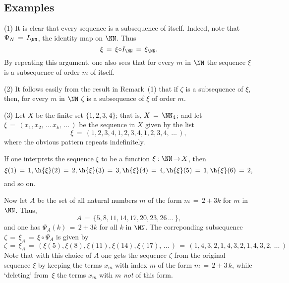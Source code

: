 {\V
\V

        \subsection{\small{{\bf Examples}}}
        \label{ExampA40.80}

\V

\hspace*{\parindent}
        (1) It is clear that every sequence is a subsequence of itself.
    Indeed, note that ${\Psi}_{N} \,=\, I_{{\NN}}$, the identity map on ${\NN}$.
    Thus
        \begin{displaymath}
        {\xi} \,=\, {\xi}{\circ}I_{{\NN}} \,=\, {\xi}_{{\NN}}.
        \end{displaymath}
    By repeating this argument, one also sees that for every $m$ in ${\NN}$ the sequence ${\xi}$ is a subsequence of order $m$ of itself.

\V

        (2) It follows easily from the result in Remark~(1) that if ${\zeta}$ is a subsequence of ${\xi}$,
    then, for every $m$ in ${\NN}$ ${\zeta}$ is a subsequence of ${\xi}$ of order $m$.

\V

        (3) Let $X$ be the finite set $\{1,2,3,4\}$; that is, $X \,=\, {\NN}_{4}$; and let ${\xi} \,=\, (x_{1}, x_{2},\,{\ldots}\,x_{k},\,{\ldots}\,)$ be the sequence in $X$ given by the list
        \begin{displaymath}
        {\xi} \,=\, (1,2,3,4,1,2,3,4,1,2,3,4,\,{\ldots}\,),
        \end{displaymath}
    where the obvious pattern repeats indefinitely.

        If one interprets the sequence ${\xi}$ to be a function ${\xi}:{\NN} \,{\rightarrow}\, X$, then
        \begin{displaymath}
        {\xi}(1) \,=\, 1, \h {\xi}(2) \,=\, 2, \h {\xi}(3) \,=\, 3, \h {\xi}(4) \,=\, 4, \h {\xi}(5) \,=\, 1, \h {\xi}(6) \,=\, 2,
        \end{displaymath}
    and so on.

        Now let $A$ be the set of all natural numbers $m$ of the form $m \,=\, 2+3k$ for $m$ in ${\NN}$. Thus,
        \begin{displaymath}
        A \,=\, \{5, 8, 11, 14, 17, 20, 23, 26\,{\ldots}\,\},
        \end{displaymath}
    and one has ${\Psi}_{A}(k) \,=\, 2+3k$ for all $k$ in ${\NN}$.
    The correponding subsequence ${\zeta} \,=\, {\xi}_{A} \,=\, {\xi}{\circ}{\Psi}_{A}$ is given by
        \begin{displaymath}
        {\zeta} \,=\, {\xi}_{A} \,=\, ({\xi}(5),{\xi}(8),{\xi}(11),{\xi}(14),{\xi}(17),\,{\ldots}\,) \,=\, 
    (1,4,3,2,1,4,3,2,1,4,3,2,\,{\ldots}\,)
        \end{displaymath}
    Note that with this choice of $A$ one gets the sequence ${\zeta}$ from the original sequence ${\xi}$
    by keeping the terms $x_{m}$ with index $m$ of the form $m \,=\, 2+3\,k$, while `deleting' from~${\xi}$ the terms $x_{m}$ with $m$ {\em not} of this form.

}

